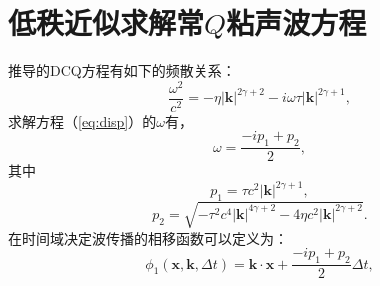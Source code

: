 
\appendix	%
\renewcommand\theequation{\Alph{chapter}--\arabic{equation}}	
\renewcommand\thefigure{\Alph{chapter}--\arabic{figure}}
\renewcommand\thetable{\Alph{chapter}--\arabic{table}}

\chapter{低秩近似求解常$Q$粘声波方程}
\label{chp:lowrank}
推导的DCQ方程有如下的频散关系：
\begin{equation}
    \frac{\omega^2}{c^2}=-\eta|\mathbf{k}|^{2\gamma+2}-i\omega\tau|\mathbf{k}|^{2\gamma+1},
	\label{eq:disp}
\end{equation}
求解方程（\ref{eq:disp}）的$\omega$有，
\begin{equation}
	\omega=\frac{-ip_1+p_2}{2},
\end{equation}
其中
\begin{equation}
	p_1=\tau c^2|\mathbf{k}|^{2\gamma+1},
	\label{eq:p1}
\end{equation}
\begin{equation}
	p_2=\sqrt{-\tau^2c^4|\mathbf{k}|^{4\gamma+2}-4\eta c^2|\mathbf{k}|^{2\gamma+2}}.
	\label{eq:p2}
\end{equation}
在时间域决定波传播的相移函数可以定义为：
\begin{equation}
	\phi_1(\mathbf{x},\mathbf{k},\Delta t)=\mathbf{k}\cdot\mathbf{x}+\frac{-ip_1+p_2}{2}\Delta t,
	\label{eq:phase_func}
\end{equation}

